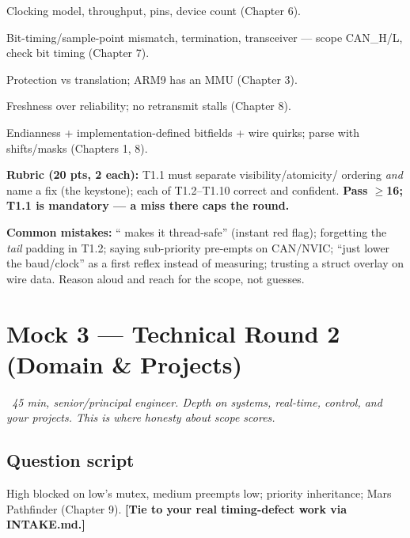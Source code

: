 Clocking model, throughput, pins, device count (Chapter 6).

Bit-timing/sample-point mismatch, termination, transceiver --- scope CAN\_H/L,
check bit timing (Chapter 7).

Protection vs translation; ARM9 has an MMU (Chapter 3).

Freshness over reliability; no retransmit stalls (Chapter 8).

Endianness + implementation-defined bitfields + wire quirks; parse with
shifts/masks (Chapters 1, 8).

\begin{scorecard}
\textbf{Rubric (20 pts, 2 each):} T1.1 must separate visibility/atomicity/
ordering \emph{and} name a fix (the keystone); each of T1.2--T1.10 correct and
confident. \textbf{Pass $\ge$16; T1.1 is mandatory --- a miss there caps the
round.}
\end{scorecard}

\textbf{Common mistakes:} `` makes it thread-safe'' (instant
red flag); forgetting the \emph{tail} padding in T1.2; saying sub-priority
pre-empts on CAN/NVIC; ``just lower the baud/clock'' as a first reflex instead
of measuring; trusting a struct overlay on wire data. Reason aloud and reach for
the scope, not guesses.

\section{Mock 3 --- Technical Round 2 (Domain \& Projects)}
\emph{~45 min, senior/principal engineer. Depth on systems, real-time, control,
and \emph{your} projects. This is where honesty about scope scores.}

\subsection*{Question script}
High blocked on low's mutex, medium preempts low; priority inheritance; Mars
Pathfinder (Chapter 9). \textbf{[Tie to your real timing-defect work via
INTAKE.md.]}

